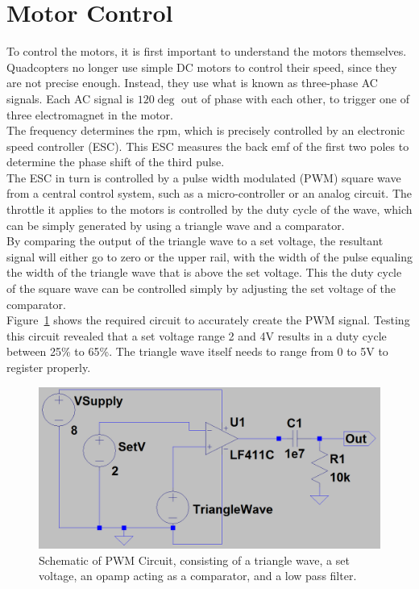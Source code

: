 \documentclass[11pt]{article} %
\begin{document}
\section{Motor Control}
To control the motors, it is first important to understand the motors themselves. Quadcopters no longer use simple DC motors to control their speed, since they are not precise enough. Instead, they use what is known as three-phase AC signals. Each AC signal is $120\deg$ out of phase with each other, to trigger one of three electromagnet in the motor.\\
The frequency determines the rpm, which is precisely controlled by an electronic speed controller (ESC). This ESC measures the back emf of the first two poles to determine the phase shift of the third pulse.\\
The ESC in turn is controlled by a pulse width modulated (PWM) square wave from a central control system, such as a micro-controller or an analog circuit. The throttle it applies to the motors is controlled by the duty cycle of the wave, which can be simply generated by using a triangle wave and a comparator.\\
By comparing the output of the triangle wave to a set voltage, the resultant signal will either go to zero or the upper rail, with the width of the pulse equaling the width of the triangle wave that is above the set voltage. This the duty cycle of the square wave can be controlled simply by adjusting the set voltage of the comparator.\\
Figure~\ref{fig:PWM} shows the required circuit to accurately create the PWM signal. Testing this circuit revealed that a set voltage range 2 and 4V results in a duty cycle between 25\% to 65\%. The triangle wave itself needs to range from 0 to 5V to register properly.
\begin{figure}[h]
	\centering
	\includegraphics[width=\textwidth]{PWM}
	\caption{Schematic of PWM Circuit, consisting of a triangle wave, a set voltage, an opamp acting as a comparator, and a low pass filter.}
	\label{fig:PWM}
\end{figure}
\end{document}
